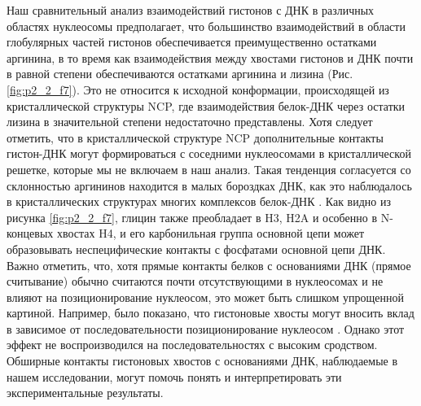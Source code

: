     Наш сравнительный анализ взаимодействий гистонов с ДНК в различных областях нуклеосомы предполагает, что большинство взаимодействий в области глобулярных частей гистонов обеспечивается преимущественно остатками аргинина, в то время как взаимодействия между хвостами гистонов и ДНК почти в равной степени обеспечиваются остатками аргинина и лизина (Рис. \ref{fig:p2_2_f7}). Это не относится к исходной конформации, происходящей из кристаллической структуры NCP, где взаимодействия белок-ДНК через остатки лизина в значительной степени недостаточно представлены. Хотя следует отметить, что в кристаллической структуре NCP дополнительные контакты гистон-ДНК могут формироваться с соседними нуклеосомами в кристаллической решетке, которые мы не включаем в наш анализ. Такая тенденция согласуется со склонностью аргининов находится в малых бороздках ДНК, как это наблюдалось в кристаллических структурах многих комплексов белок-ДНК \cite{rohs_role_2009}. Как видно из рисунка \ref{fig:p2_2_f7}, глицин также преобладает в H3, H2A и особенно в N-концевых хвостах H4, и его карбонильная группа основной цепи может образовывать неспецифические контакты с фосфатами основной цепи ДНК. Важно отметить, что, хотя прямые контакты белков с основаниями ДНК (прямое считывание) обычно считаются почти отсутствующими в нуклеосомах и не влияют на позиционирование нуклеосом, это может быть слишком упрощенной картиной. Например, было показано, что гистоновые хвосты могут вносить вклад в зависимое от последовательности позиционирование нуклеосом \cite{yang_core_2007}. Однако этот эффект не воспроизводился на последовательностях с высоким сродством. Обширные контакты гистоновых хвостов с основаниями ДНК, наблюдаемые в нашем исследовании, могут помочь понять и интерпретировать эти экспериментальные результаты.

